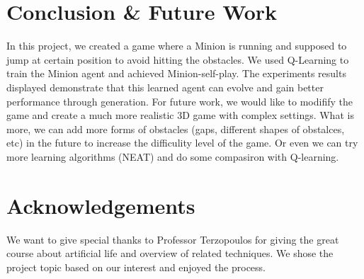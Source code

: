 \documentclass{acmsiggraph}
\begin{document}
\section{Conclusion \& Future Work}
In this project, we created a game where a Minion is running and supposed to jump at certain position to avoid hitting the obstacles. We used Q-Learning to train the Minion agent and achieved Minion-self-play. The experiments results displayed demonstrate that this learned agent can evolve and gain better performance through generation. 
For future work, we would like to modifify the game and create a much more realistic 3D game with complex settings. What is more, we can add more forms of obstacles (gaps, different shapes of obstalces, etc) in the future to increase the difficulity level of the game. Or even we can try more learning algorithms (NEAT) and do some compasiron with Q-learning.


\section*{Acknowledgements}
We want to give special thanks to Professor Terzopoulos for giving the great course about artificial life and overview of related techniques. We shose the project topic based on our interest and enjoyed the process.


\nocite{*}

\end{document}
